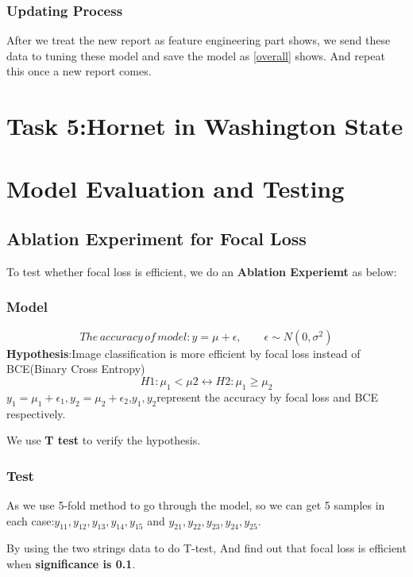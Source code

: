 \documentclass[12pt]{article}
\begin{document}
\subsubsection{Updating Process}
After we treat the new report as feature engineering part shows, we send these data to tuning these model and save the model as \ref{overall} shows. And repeat this once a new report comes.



\section{Task 5:Hornet in Washington State}





\section{Model Evaluation and Testing}
\subsection{Ablation Experiment for Focal Loss }
To test whether focal loss is efficient, we do an \textbf{Ablation Experiemt }as below:
\subsubsection{Model}
\begin{equation*}
The\,accuracy\,of\,model:y=\mu+\epsilon,\qquad \epsilon\sim N(0,\sigma^2)
\end{equation*}
\textbf{Hypothesis}:Image classification is more efficient by focal loss instead of BCE(Binary Cross Entropy)
\begin{equation*}
H1:\mu_1<\mu2\leftrightarrow H2:\mu_1\geq \mu_2
\end{equation*}
$y_1=\mu_1+\epsilon_1,y_2=\mu_2+\epsilon_2$,$y_1,y_2$represent the accuracy by focal loss and BCE respectively.

We use \textbf{T test} to verify the hypothesis.
\subsubsection{Test}
As we use 5-fold method to go through the model, so we can get 5 samples in each case:$y_{11},y_{12},y_{13},y_{14},y_{15}$ and $y_{21},y_{22},y_{23},y_{24},y_{25}$.

By using the two strings data to do T-test, And find out that focal loss is efficient when \textbf{significance is 0.1}.
\end{document}
